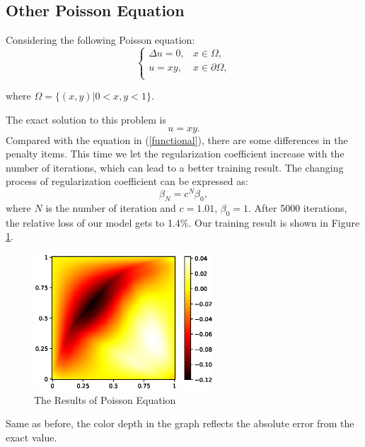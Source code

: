 \documentclass{article}
\begin{document}
\subsection{Other Poisson Equation}
\par Considering the following Poisson equation:
\begin{equation}
	\begin{cases}
		\Delta u=0, & x\in \Omega, \\
 		u=xy, & x\in \partial \Omega, \\
 	\end{cases}
\end{equation}

where $\Omega =\{(x,y)| 0<x,y<1\}$.
\par The exact solution to this problem is 
\begin{equation}
u=xy.
\end{equation}
Compared with the equation in (\ref{functional}), there are some differences in the penalty items. This time we let the regularization coefficient increase with the number of iterations, which can lead to a better training result. The changing process of regularization coefficient can be expressed as:
\begin{equation}
\beta_{N} = c^{N}\beta_{0},
\end{equation}
where $N$ is the number of iteration and $c = 1.01$, $\beta_0=1$. After 5000 iterations, the relative loss of our model gets to 1.4\%. Our training result is shown in Figure \ref{3.2a}.
\begin{figure}[ht]
 	 \centering
 	 \includegraphics[width=0.6\textwidth]{./images/loss_5_3.eps} 
	 \caption{The Results of Poisson Equation}
	 \label{3.2a}
\end{figure}

Same as before, the color depth in the graph reflects the absolute error from the exact value.
\end{document}

